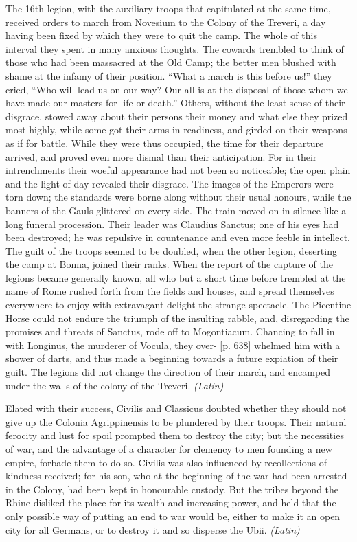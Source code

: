 The 16th legion, with the auxiliary troops that capitulated at the same time, received orders to march from Novesium to the Colony of the Treveri, a day having been fixed by which they were to quit the camp. The whole of this interval they spent in many anxious thoughts. The cowards trembled to think of those who had been massacred at the Old Camp; the better men blushed with shame at the infamy of their position. ``What a march is this before us!'' they cried, ``Who will lead us on our way? Our all is at the disposal of those whom we have made our masters for life or death.'' Others, without the least sense of their disgrace, stowed away about their persons their money and what else they prized most highly, while some got their arms in readiness, and girded on their weapons as if for battle. While they were thus occupied, the time for their departure arrived, and proved even more dismal than their anticipation. For in their intrenchments their woeful appearance had not been so noticeable; the open plain and the light of day revealed their disgrace. The images of the Emperors were torn down; the standards were borne along without their usual honours, while the banners of the Gauls glittered on every side. The train moved on in silence like a long funeral procession. Their leader was Claudius Sanctus; one of his eyes had been destroyed; he was repulsive in countenance and even more feeble in intellect. The guilt of the troops seemed to be doubled, when the other legion, deserting the camp at Bonna, joined their ranks. When the report of the capture of the legions became generally known, all who but a short time before trembled at the name of Rome rushed forth from the fields and houses, and spread themselves everywhere to enjoy with extravagant delight the strange spectacle. The Picentine Horse could not endure the triumph of the insulting rabble, and, disregarding the promises and threats of Sanctus, rode off to Mogontiacum. Chancing to fall in with Longinus, the murderer of Vocula, they over- [p. 638] whelmed him with a shower of darts, and thus made a beginning towards a future expiation of their guilt. The legions did not change the direction of their march, and encamped under the walls of the colony of the Treveri. \emph{(Latin)}


Elated with their success, Civilis and Classicus doubted whether they should not give up the Colonia Agrippinensis to be plundered by their troops. Their natural ferocity and lust for spoil prompted them to destroy the city; but the necessities of war, and the advantage of a character for clemency to men founding a new empire, forbade them to do so. Civilis was also influenced by recollections of kindness received; for his son, who at the beginning of the war had been arrested in the Colony, had been kept in honourable custody. But the tribes beyond the Rhine disliked the place for its wealth and increasing power, and held that the only possible way of putting an end to war would be, either to make it an open city for all Germans, or to destroy it and so disperse the Ubii. \emph{(Latin)}

